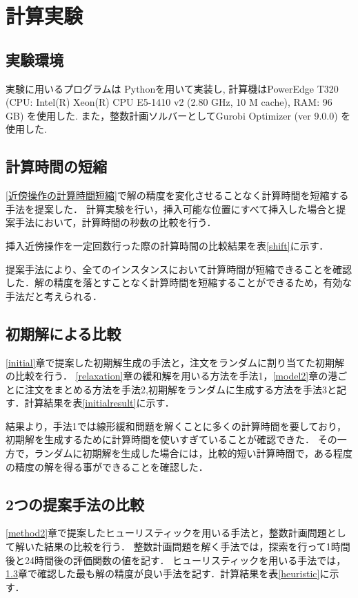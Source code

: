 \chapter{計算実験}\label{computational_result}
\section{実験環境}
実験に用いるプログラムは Pythonを用いて実装し, 計算機はPowerEdge T320 (CPU: Intel(R) Xeon(R) CPU E5-1410 v2 (2.80 GHz, 10 M cache), RAM: 96 GB) を使用した. また，整数計画ソルバーとしてGurobi Optimizer (ver 9.0.0) を使用した.

\section{計算時間の短縮}
\ref{近傍操作の計算時間短縮}で解の精度を変化させることなく計算時間を短縮する手法を提案した．
計算実験を行い，挿入可能な位置にすべて挿入した場合と提案手法において，計算時間の秒数の比較を行う．

挿入近傍操作を一定回数行った際の計算時間の比較結果を表\ref{shift}に示す．

提案手法により、全てのインスタンスにおいて計算時間が短縮できることを確認した．解の精度を落とすことなく計算時間を短縮することができるため，有効な手法だと考えられる．

\section{初期解による比較}
\label{sectioninitial}
\ref{initial}章で提案した初期解生成の手法と，注文をランダムに割り当てた初期解の比較を行う．
\ref{relaxation}章の緩和解を用いる方法を手法1，\ref{model2}章の港ごとに注文をまとめる方法を手法2,初期解をランダムに生成する方法を手法3と記す．計算結果を表\ref{initialresult}に示す．

結果より，手法1では線形緩和問題を解くことに多くの計算時間を要しており，初期解を生成するために計算時間を使いすぎていることが確認できた．
その一方で，ランダムに初期解を生成した場合には，比較的短い計算時間で，ある程度の精度の解を得る事ができることを確認した．


\section{2つの提案手法の比較}
\ref{method2}章で提案したヒューリスティックを用いる手法と，整数計画問題として解いた結果の比較を行う．
整数計画問題を解く手法では，探索を行って1時間後と24時間後の評価関数の値を記す．
ヒューリスティックを用いる手法では，\ref{sectioninitial}章で確認した最も解の精度が良い手法を記す．計算結果を表\ref{heuristic}に示す．

